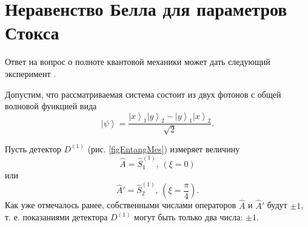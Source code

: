 \section{Неравенство Белла для параметров Стокса}
\label{pPart3EntangleBell}
Ответ на вопрос о полноте квантовой механики может дать следующий
эксперимент \cite{bBell, bPhisQuantInfo, PhysRevLett.28.938}.

Допустим, что рассматриваемая система состоит из двух фотонов с общей
волновой функцией вида
\begin{equation}
\left|\psi\right> = \frac{
\left|x\right>_1\left|y\right>_2 -
\left|y\right>_1\left|x\right>_2
}{\sqrt{2}}.
\label{eqBellInequalityState}
\end{equation}

Пусть детектор $D^{(1)}$ (рис. \ref{figEntangMes}) измеряет величину 
\[
\hat{A} = \hat{S}_1^{(1)}, \, (\xi = 0)
\] 
или
\[
\hat{A}' = \hat{S}_2^{(1)},\,(\xi =\frac{\pi}{4}).
\]
Как уже отмечалось ранее, собственными числами операторов $\hat{A}$ и
$\hat{A}'$ будут $\pm 1$, т. е. показаниями детектора $D^{(1)}$ могут
быть только два числа: $\pm 1$.

